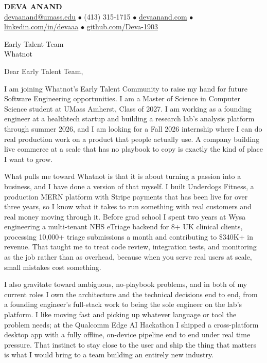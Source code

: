 \documentclass[letterpaper,11pt]{article}
\begin{document}
\begin{center}
    {\fontsize{18}{20}\selectfont\bfseries DEVA ANAND}\\ \vspace{3pt}
    {\small
    \href{mailto:devaanand@umass.edu}{devaanand@umass.edu}
    \enspace$\bullet$\enspace
    (413) 315-1715
    \enspace$\bullet$\enspace
    \href{https://devaanand.com}{devaanand.com}
    \enspace$\bullet$\enspace
    \href{https://linkedin.com/in/devaaa/}{linkedin.com/in/devaaa}
    \enspace$\bullet$\enspace
    \href{https://github.com/Deva-1903}{github.com/Deva-1903}}
\end{center}
\vspace{6pt}

\noindent Early Talent Team \\
Whatnot

\vspace{2pt}

\noindent Dear Early Talent Team,

I am joining Whatnot's Early Talent Community to raise my hand for future Software Engineering opportunities. I am a Master of Science in Computer Science student at UMass Amherst, Class of 2027. I am working as a founding engineer at a healthtech startup and building a research lab's analysis platform through summer 2026, and I am looking for a Fall 2026 internship where I can do real production work on a product that people actually use. A company building live commerce at a scale that has no playbook to copy is exactly the kind of place I want to grow.

What pulls me toward Whatnot is that it is about turning a passion into a business, and I have done a version of that myself. I built Underdogs Fitness, a production MERN platform with Stripe payments that has been live for over three years, so I know what it takes to run something with real customers and real money moving through it. Before grad school I spent two years at Wysa engineering a multi-tenant NHS eTriage backend for 8+ UK clinical clients, processing 10,000+ triage submissions a month and contributing to \$340K+ in revenue. That taught me to treat code review, integration tests, and monitoring as the job rather than as overhead, because when you serve real users at scale, small mistakes cost something.

I also gravitate toward ambiguous, no-playbook problems, and in both of my current roles I own the architecture and the technical decisions end to end, from a founding engineer's full-stack work to being the sole engineer on the lab's platform. I like moving fast and picking up whatever language or tool the problem needs; at the Qualcomm Edge AI Hackathon I shipped a cross-platform desktop app with a fully offline, on-device pipeline end to end under real time pressure. That instinct to stay close to the user and ship the thing that matters is what I would bring to a team building an entirely new industry.
\end{document}
